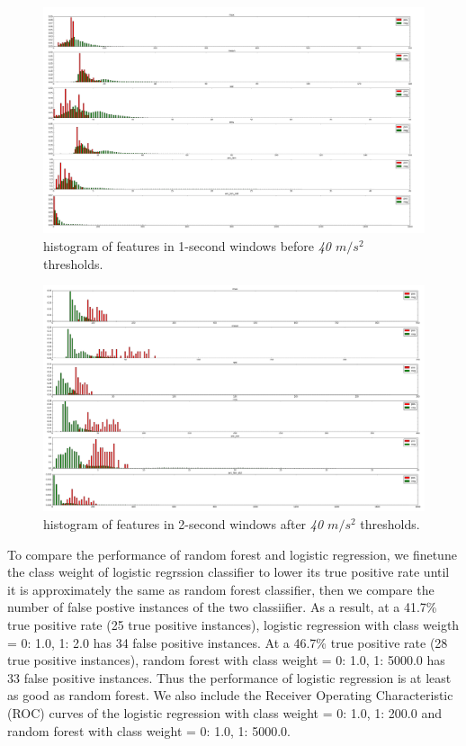 \documentclass{soups}
\begin{document}
\begin{figure}[t]
\begin{center}
\includegraphics[width=1.0\columnwidth]{hist_features_before_win_size_1_2.png}
\end{center}
\caption{histogram of features in 1-second windows before \textit{40 $m/s^2$} thresholds.}
\end{figure}

\begin{figure}[t]
\begin{center}
\includegraphics[width=1.0\columnwidth]{hist_features_after_win_size_1_2.png}
\end{center}
\caption{histogram of features in 2-second windows after \textit{40 $m/s^2$} thresholds.}
\end{figure}

To compare the performance of random forest and logistic regression, we finetune the class weight of logistic regrssion classifier to lower its true positive rate until it is approximately the same as random forest classifier, then we compare the number of false postive instances of the two classiifier. 
As a result, at a 41.7\% true positive rate (25 true positive instances), logistic regression with class weigth = {0: 1.0, 1: 2.0} has 34 false positive instances. 
At a 46.7\% true positive rate (28 true positive instances), random forest with class weight = {0: 1.0, 1: 5000.0} has 33 false positive instances. 
Thus the performance of logistic regression is at least as good as random forest.
We also include the Receiver Operating Characteristic (ROC) curves of the logistic regression with class weight = {0: 1.0, 1: 200.0} and random forest with class weight = {0: 1.0, 1: 5000.0}. 
\end{document}
